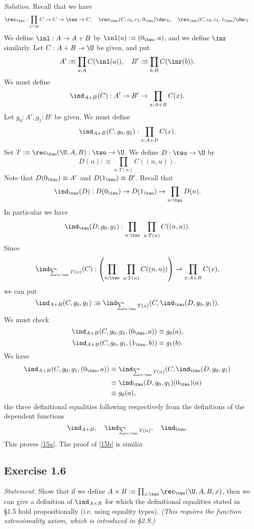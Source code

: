 \documentclass[12pt]{article}
\begin{document}
\nn\emph{Solution.} Recall that we have 
$$
\rec_\two:\prod_{C:\U}C\to C\to\two\to C,\quad\rec_\two(C,c_0,c_1,0_\two)\de c_0,\quad\rec_\two(C,c_0,c_1,1_\two)\de c_1.
$$
We define $\inl:A\to A+B$ by $\inl(a):\equiv(0_\two,a)$, and we define $\inr$ similarly. Let $C:A+B\to\U$ be given, and put 
$$
A':\equiv\prod_{a:A}C(\inl(a)),\quad B':\equiv\prod_{b:B}C(\inr(b)).
$$
We must define 
$$
\ind_{A+B}(C):A'\to B'\to\prod_{x:A+B}C(x).
$$ 
Let $g_0:A',g_1:B'$ be given. We must define 
$$
\ind_{A+B}(C,g_0,g_1):\prod_{x:A+B}C(x).
$$ 
Set $T:\equiv\rec_\two(\U,A,B):\two\to\U$. We define $D:\two\to\U$ by 
$$
D(n):\equiv\prod_{u:T(n)}C((n,u)).
$$ 
Note that $D(0_\two)\equiv A'$ and $D(1_\two)\equiv B'$. Recall that 
$$
\ind_\two(D):D(0_\two)\to D(1_\two)\to\prod_{n:\two}D(n).
$$ 
In particular we have 
$$
\ind_\two(D,g_0,g_1):\prod_{n:\two}\ \prod_{u:T(n)}C((n,u)).
$$ 
Since 
$$
\ind_{\sum_{n:\two}T(n)}(C):\left(\prod_{n:\two}\ \prod_{u:T(n)}C((n,u))\right)\to\prod_{x:A+B}C(x),
$$ 
we can put 
$$
\ind_{A+B}(C,g_0,g_1):\equiv\ind_{\sum_{n:\two}T(n)}(C,\ind_\two(D,g_0,g_1)).
$$ 
We must check 
\begin{equation}\label{15a}
\ind_{A+B}(C,g_0,g_1,(0_\two,a))\equiv g_0(a),
\end{equation}
\begin{equation}\label{15b}
\ind_{A+B}(C,g_0,g_1,(1_\two,b))\equiv g_1(b).
\end{equation} 
We have 
\begin{align*}
\ind_{A+B}(C,g_0,g_1,(0_\two,a))&\equiv\ind_{\sum_{n:\two}T(n)}(C,\ind_\two(D,g_0,g_1)\\ 
&\equiv\ind_\two(D,g_0,g_1)(0_\two)(a)\\ 
&\equiv g_0(a),
\end{align*}
the three definitional equalities following respectively from the definitions of the dependent functions
$$
\ind_{A+B},\quad\ind_{\sum_{n:\two}T(n)},\quad\ind_\two.
$$ 
This proves \eqref{15a}. The proof of \eqref{15b} is similar.


\subsection{Exercise 1.6}

\emph{Statement.} Show that if we define $A\times B:\equiv\prod_{x:\two}\rec_\two(\U,A,B,x)$, then we can give a definition of  $\ind_{A\times B}$ for which the definitional equalities stated in \S1.5 hold propositionally (i.e. using equality types). \emph{(This requires the function extensionality axiom, which is introduced in \S2.9.)}
\end{document}
